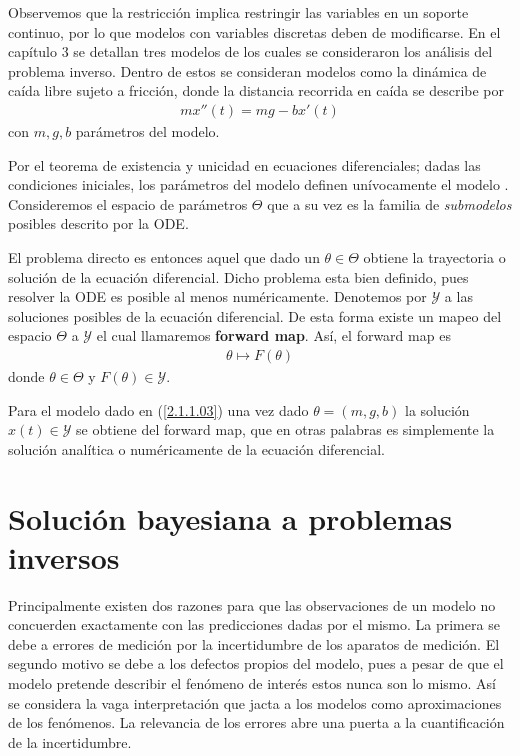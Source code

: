 Observemos que la restricción implica restringir las variables en un soporte continuo, por lo que modelos con variables discretas deben de modificarse. En el capítulo 3 se detallan tres modelos de los cuales se consideraron los análisis del problema inverso. Dentro de estos se consideran modelos como la dinámica de caída libre sujeto a fricción, donde la distancia recorrida en caída se describe por
\begin{align}
    mx''(t) = mg - bx'(t)
    \label{2.1.1.03}
\end{align}
con $m, g, b$ parámetros del modelo.

Por el teorema de existencia y unicidad en ecuaciones diferenciales; dadas las condiciones iniciales, los parámetros del modelo definen unívocamente el modelo \cite{kelley2010theory}. Consideremos el espacio de parámetros $\Theta$ que a su vez es la familia de \textit{submodelos} posibles descrito por la ODE. 


El problema directo es entonces aquel que dado un $\theta \in \Theta$ obtiene la trayectoria o solución de la ecuación diferencial. Dicho problema esta bien definido, pues resolver la ODE es posible al menos numéricamente. Denotemos por $\mathcal{Y}$ a las soluciones posibles de la ecuación diferencial. De esta forma existe un mapeo del espacio $\Theta$ a $\mathcal{Y}$ el cual llamaremos \textbf{forward map}. Así, el forward map es 
\begin{align*}
    \theta \mapsto F(\theta) 
\end{align*}
donde $\theta \in \Theta$ y $F(\theta) \in \mathcal{Y}$.

Para el modelo dado en (\ref{2.1.1.03}) una vez dado $\theta = (m,g,b)$ la solución $x(t) \in \mathcal{Y}$ se obtiene del forward map, que en otras palabras es simplemente la solución analítica o numéricamente de la ecuación diferencial.

\section{Solución bayesiana a  problemas inversos}


Principalmente existen dos razones para que las observaciones de un modelo no concuerden exactamente con las predicciones dadas por el mismo. La primera se debe a errores de medición por la incertidumbre de los aparatos de medición. El segundo motivo se debe a los defectos propios del modelo, pues a pesar de que el modelo pretende describir el fenómeno de interés estos nunca son lo mismo. Así se considera la vaga interpretación que jacta a los modelos como aproximaciones de los fenómenos. La relevancia de los errores abre una puerta a la cuantificación de la incertidumbre.

